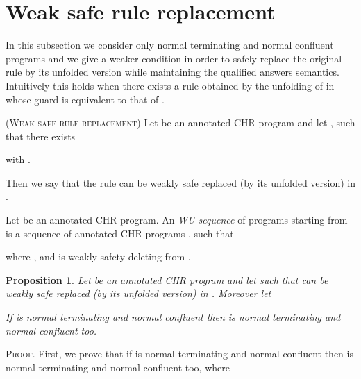 \documentclass[final]{acmtrans2e}
\newtheorem{proposition}[theorem]{Proposition}
\begin{document}
\noindent{}


\section{Weak safe rule replacement}
In this subsection we consider only normal terminating and normal confluent programs and we give a weaker condition in order to safely replace the original rule  by its unfolded version while maintaining the qualified answers semantics. Intuitively this holds when there exists a rule obtained by the unfolding of  in  whose guard is equivalent to that of .

\begin{definition}\textsc{(Weak safe rule replacement)}\label{def:wsafedel}
Let  be an annotated CHR program and let , such that there exists

with .


Then we say that the rule 
can be weakly safe replaced (by its unfolded version) in .
\end{definition}

\begin{definition}[WU-sequence]\label{def:wuno}
Let  be an annotated CHR program. An \emph{WU-sequence} of programs
starting from  is a sequence of annotated CHR programs , such that

 where ,  and   is
weakly safety deleting from .
\end{definition}

\begin{proposition}\label{prop:wterm}
Let  be an annotated CHR program and let  such that 
can be weakly safe replaced (by its unfolded version) in . Moreover let


    If  is normal terminating and normal confluent then   is normal terminating and normal confluent too.
\end{proposition}
\textsc{Proof.}
First, we prove that if  is normal terminating and normal confluent then   is normal terminating and normal confluent too, where
\end{document}
